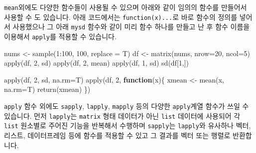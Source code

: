 \documentclass[
]{book}
\newenvironment{Shaded}{\begin{snugshade}}{\end{snugshade}}
\newcommand{\AttributeTok}[1]{\textcolor[rgb]{0.77,0.63,0.00}{#1}}
\newcommand{\ControlFlowTok}[1]{\textcolor[rgb]{0.13,0.29,0.53}{\textbf{#1}}}
\newcommand{\DecValTok}[1]{\textcolor[rgb]{0.00,0.00,0.81}{#1}}
\newcommand{\FunctionTok}[1]{\textcolor[rgb]{0.00,0.00,0.00}{#1}}
\newcommand{\NormalTok}[1]{#1}
\newcommand{\OtherTok}[1]{\textcolor[rgb]{0.56,0.35,0.01}{#1}}
\newcommand{\SpecialCharTok}[1]{\textcolor[rgb]{0.00,0.00,0.00}{#1}}
\begin{document}
\texttt{mean}외에도 다양한 함수들이 사용될 수 있으며 아래와 같이 임의의 함수를 만들어서 사용할 수 도 있습니다. 아래 코드에서는 \texttt{function(x)...}로 바로 함수의 정의를 넣어서 사용했으나 그 아래 \texttt{mysd} 함수와 같이 미리 함수 하나를 만들고 난 후 함수 이름을 이용해서 \texttt{apply}를 적용할 수 있습니다.

\begin{Shaded}
\begin{Highlighting}[]
\NormalTok{nums }\OtherTok{\textless{}{-}} \FunctionTok{sample}\NormalTok{(}\DecValTok{1}\SpecialCharTok{:}\DecValTok{100}\NormalTok{, }\DecValTok{100}\NormalTok{, }\AttributeTok{replace =}\NormalTok{ T)}
\NormalTok{df }\OtherTok{\textless{}{-}} \FunctionTok{matrix}\NormalTok{(nums, }\AttributeTok{nrow=}\DecValTok{20}\NormalTok{, }\AttributeTok{ncol=}\DecValTok{5}\NormalTok{)}
\FunctionTok{apply}\NormalTok{(df, }\DecValTok{2}\NormalTok{, sd)}
\FunctionTok{apply}\NormalTok{(df, }\DecValTok{2}\NormalTok{, mean)}
\FunctionTok{apply}\NormalTok{(df, }\DecValTok{1}\NormalTok{, sd)}
\FunctionTok{sd}\NormalTok{(df[}\DecValTok{1}\NormalTok{,])}

\FunctionTok{apply}\NormalTok{(df, }\DecValTok{2}\NormalTok{, sd, }\AttributeTok{na.rm=}\NormalTok{T)}
\FunctionTok{apply}\NormalTok{(df, }\DecValTok{2}\NormalTok{, }\ControlFlowTok{function}\NormalTok{(x)\{ }
\NormalTok{  xmean }\OtherTok{\textless{}{-}} \FunctionTok{mean}\NormalTok{(x, }\AttributeTok{na.rm=}\NormalTok{T) }
  \FunctionTok{return}\NormalTok{(xmean)}
\NormalTok{  \})}
\end{Highlighting}
\end{Shaded}

\texttt{apply} 함수 외에도 \texttt{sapply}, \texttt{lapply}, \texttt{mapply} 등의 다양한 \texttt{apply}계열 함수가 쓰일 수 있습니다. 먼저 \texttt{lapply}는 \texttt{matrix} 형태 데이터가 아닌 \texttt{list} 데이터에 사용되어 각 \texttt{list} 원소별로 주어진 기능을 반복해서 수행하며 \texttt{sapply}는 \texttt{lapply}와 유사하나 벡터, 리스트, 데이터프레임 등에 함수를 적용할 수 있고 그 결과를 벡터 또는 행렬로 반환합니다.
\end{document}
